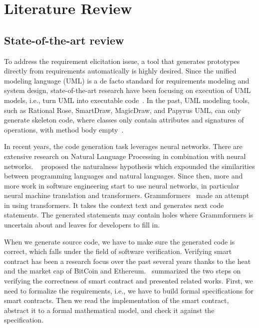 \chapter{Literature Review}



\section{State-of-the-art review}

To address the requirement elicitation issue, a tool that generates prototypes directly from requirements automatically is highly desired.
Since the unified modeling language (UML) is a de facto standard for requirements modeling and system design,
state-of-the-art research have been focusing on execution of UML models, i.e., turn UML into executable code~\cite{ciccozzi2019execution}.
In the past, UML modeling tools, such as Rational Rose, SmartDraw, MagicDraw, and Papyrus UML, can only generate skeleton code, where classes only contain attributes and signatures of operations, with method body empty~\cite{regep2000using}.

In recent years, the code generation task leverages neural networks.
There are extensive research on Natural Language Processing in combination with neural networks. ~\cite{allamanis2018survey} proposed the naturalness hypothesis which expounded the similarities between programming languages and natural languages. Since then, more and more work in software engineering start to use neural networks, in particular neural machine translation and transformers.
Grammformers~\cite{guo2021learning} made an attempt in using transformers. It takes the context text and generates next code statements. The generated statements may contain holes where Grammformers is uncertain about and leaves for developers to fill in.

When we generate source code, we have to make sure the generated code is correct, which falls under the field of software verification.
Verifying smart contract has been a research focus over the past several years thanks to the heat and the market cap of BitCoin and Ethereum.
\cite{tolmach2021survey}~summarized the two steps on verifying the correctness of smart contract and presented related works.
First, we need to formalize the requirements, i.e., we have to build formal specifications for smart contracts.
Then we read the implementation of the smart contract, abstract it to a formal mathematical model, and check it against the specification.


